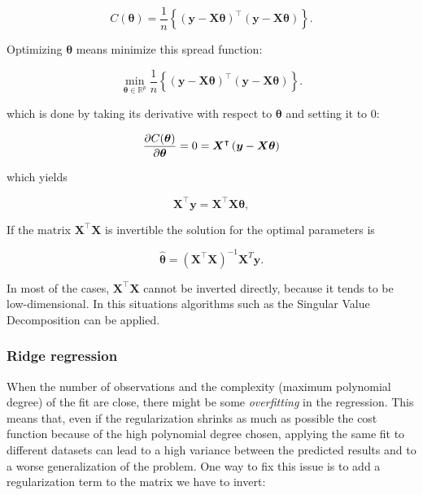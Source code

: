 \documentclass[11pt,a4paper,twocolumn]{article}
\begin{document}
\begin{equation}
	C(\boldsymbol{\theta})=\frac{1}{n}\left\{\left(\boldsymbol{y}-\boldsymbol{X}\boldsymbol{\theta}\right)^\intercal \left(\boldsymbol{y}-\boldsymbol{X}\boldsymbol{\theta}\right)\right\}.
\end{equation}

Optimizing $\boldsymbol{\theta}$ means minimize this spread function:

\begin{equation}
	{\displaystyle \min_{\boldsymbol{\theta}\in
			{\mathbb{R}}^{p}}}\frac{1}{n}\left\{\left(\boldsymbol{y}-\boldsymbol{X}\boldsymbol{\theta}\right)^\intercal\left(\boldsymbol{y}-\boldsymbol{X}\boldsymbol{\theta}\right)\right\}.
\end{equation}

which is done by taking its derivative with respect to $\boldsymbol{\theta}$ and setting it to 0:

\begin{equation}
	\pdv{C(\boldsymbol{\theta})}{\boldsymbol{\theta}} = 0 = \boldsymbol{X}^\intercal\left( \boldsymbol{y}-\boldsymbol{X}\boldsymbol{\theta}\right)
\end{equation}

which yields 

\begin{equation}
	\boldsymbol{X}^\intercal\boldsymbol{y} = \boldsymbol{X}^\intercal \boldsymbol{X}\boldsymbol{\theta},
\end{equation}

If the matrix $\boldsymbol{X}^\intercal\boldsymbol{X}$ is invertible the solution for the optimal parameters is 

\begin{equation}
	\hat{\boldsymbol{\theta}} =\left(\boldsymbol{X}^\intercal\boldsymbol{X}\right)^{-1}\boldsymbol{X}^T\boldsymbol{y}.
\end{equation}

In most of the cases, $\boldsymbol{X}^\intercal\boldsymbol{X}$ cannot be inverted directly, because it tends to be low-dimensional. In this situations algorithms such as the Singular Value Decomposition can be applied.

\subsubsection{Ridge regression}
When the number of observations and the complexity (maximum polynomial degree) of the fit are close, there might be some \emph{overfitting} in the regression. This means that, even if the regularization shrinks as much as possible the cost function because of the high polynomial degree chosen, applying the same fit to different datasets can lead to a high variance between the predicted results and to a worse generalization of the problem. One way to fix this issue is to add a regularization term to the matrix we have to invert:
\end{document}
